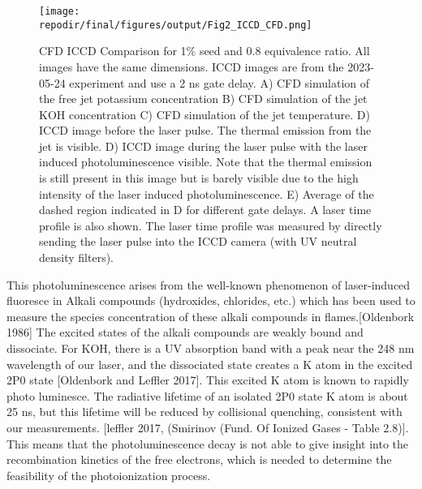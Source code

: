 \begin{figure}[h]
    \texttt{[image: \\repodir/final/figures/output/Fig2\_ICCD\_CFD.png]} 
    \caption{CFD ICCD Comparison for 1\% seed and 0.8 equivalence ratio. All images have the same dimensions. ICCD images are from the 2023-05-24 experiment and use a 2 ns gate delay. A) CFD simulation of the free jet potassium concentration B) CFD simulation of the jet KOH concentration C) CFD simulation of the jet temperature. D) ICCD image before the laser pulse. The thermal emission from the jet is visible. D) ICCD image during the laser pulse with the laser induced photoluminescence visible. Note that the thermal emission is still present in this image but is barely visible due to the high intensity of the laser induced photoluminescence. E) Average of the dashed region indicated in D for different gate delays. A laser time profile is also shown. The laser time profile was measured by directly sending the laser pulse into the ICCD camera (with UV neutral density filters). }
    \label{fig:ICCD_CFD}
\end{figure}

This photoluminescence arises from the well-known phenomenon of laser-induced fluoresce in Alkali compounds (hydroxides, chlorides, etc.) which has been used to measure the species concentration of these alkali compounds in flames.[Oldenbork 1986] The excited states of the alkali compounds are weakly bound and dissociate. For KOH, there is a UV absorption band with a peak near the 248 nm wavelength of our laser, and the dissociated state creates a K atom in the excited 2P0 state [Oldenbork and Leffler 2017]. This excited K atom is known to rapidly photo luminesce. The radiative lifetime of an isolated 2P0 state K atom is about 25 ns, but this lifetime will be reduced by collisional quenching, consistent with our measurements. [leffler 2017, (Smirinov (Fund. Of Ionized Gases - Table 2.8)]. This means that the photoluminescence decay is not able to give insight into the recombination kinetics of the free electrons, which is needed to determine the feasibility of the photoionization process.



